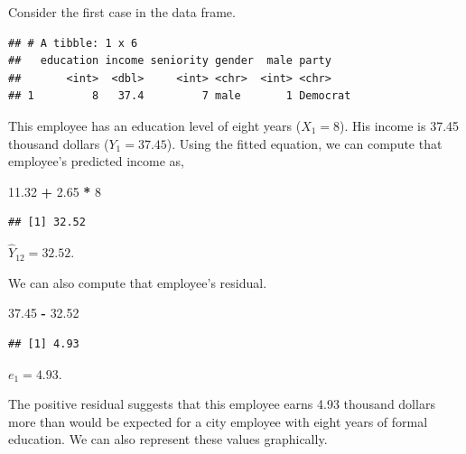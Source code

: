 \documentclass[]{book}
\newenvironment{Shaded}{\begin{snugshade}}{\end{snugshade}}
\newcommand{\DecValTok}[1]{\textcolor[rgb]{0.00,0.00,0.81}{#1}}
\newcommand{\FloatTok}[1]{\textcolor[rgb]{0.00,0.00,0.81}{#1}}
\newcommand{\KeywordTok}[1]{\textcolor[rgb]{0.13,0.29,0.53}{\textbf{#1}}}
\newcommand{\NormalTok}[1]{#1}
\newcommand{\OperatorTok}[1]{\textcolor[rgb]{0.81,0.36,0.00}{\textbf{#1}}}
\newcommand{\StringTok}[1]{\textcolor[rgb]{0.31,0.60,0.02}{#1}}
\theoremstyle{definition}
\theoremstyle{definition}
\theoremstyle{definition}
\theoremstyle{remark}
\begin{document}
Consider the first case in the data frame.

\begin{Shaded}
\end{Shaded}

\begin{verbatim}
## # A tibble: 1 x 6
##   education income seniority gender  male party   
##       <int>  <dbl>     <int> <chr>  <int> <chr>   
## 1         8   37.4         7 male       1 Democrat
\end{verbatim}

This employee has an education level of eight years (\(X_{1}=8\)). His
income is 37.45 thousand dollars (\(Y_{1}=37.45\)). Using the fitted
equation, we can compute that employee's predicted income as,

\begin{Shaded}
\begin{Highlighting}[]
\FloatTok{11.32} \OperatorTok{+}\StringTok{ }\FloatTok{2.65} \OperatorTok{*}\StringTok{ }\DecValTok{8}
\end{Highlighting}
\end{Shaded}

\begin{verbatim}
## [1] 32.52
\end{verbatim}

\(\hat{Y}_{12} = 32.52\).

We can also compute that employee's residual.

\begin{Shaded}
\begin{Highlighting}[]
\FloatTok{37.45} \OperatorTok{-}\StringTok{ }\FloatTok{32.52}
\end{Highlighting}
\end{Shaded}

\begin{verbatim}
## [1] 4.93
\end{verbatim}

\(e_{1} = 4.93\).

The positive residual suggests that this employee earns 4.93 thousand
dollars more than would be expected for a city employee with eight years
of formal education. We can also represent these values graphically.
\end{document}
